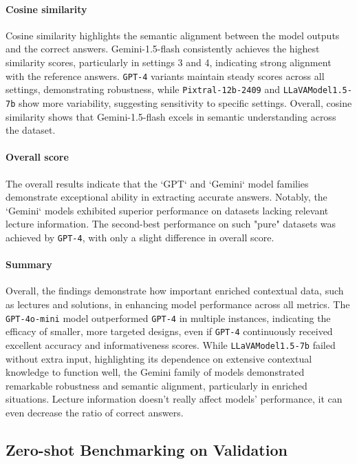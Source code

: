 \documentclass{article}
\begin{document}
\paragraph{Cosine similarity}
Cosine similarity highlights the semantic alignment between the model outputs and the correct answers. {Gemini-1.5-flash} consistently achieves the highest similarity scores, particularly in settings 3 and 4, indicating strong alignment with the reference answers. \texttt{GPT-4} variants maintain steady scores across all settings, demonstrating robustness, while \texttt{Pixtral-12b-2409} and \texttt{LLaVAModel1.5-7b} show more variability, suggesting sensitivity to specific settings. Overall, cosine similarity shows that {Gemini-1.5-flash} excels in semantic understanding across the dataset.

\paragraph{Overall score}
The overall results indicate that the `GPT` and `Gemini` model families demonstrate exceptional ability in extracting accurate answers. Notably, the `Gemini` models exhibited superior performance on datasets lacking relevant lecture information. The second-best performance on such "pure" datasets was achieved by \texttt{GPT-4}, with only a slight difference in overall score.

\paragraph{Summary}
Overall, the findings demonstrate how important enriched contextual data, such as lectures and solutions, in enhancing model performance across all metrics. The \texttt{GPT-4o-mini} model outperformed \texttt{GPT-4} in multiple instances, indicating the efficacy of smaller, more targeted designs, even if \texttt{GPT-4} continuously received excellent accuracy and informativeness scores. While \texttt{LLaVAModel1.5-7b} failed without extra input, highlighting its dependence on extensive contextual knowledge to function well, the Gemini family of models demonstrated remarkable robustness and semantic alignment, particularly in enriched situations.
Lecture information doesn’t really affect models’ performance, it can even decrease the ratio of correct answers.


\subsection{Zero-shot Benchmarking on Validation}
\end{document}
